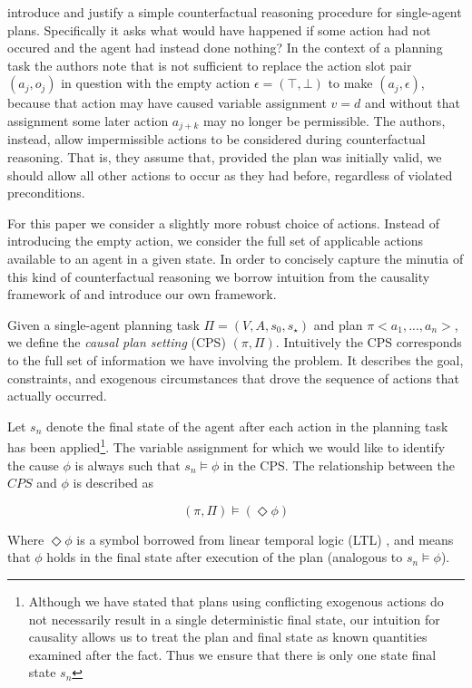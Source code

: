 \documentclass{article}
\theoremstyle{plain}
\theoremstyle{definition}
\begin{document}
\cite{lind2019ethical} introduce and justify a simple counterfactual reasoning procedure for single-agent plans. Specifically it asks what would have happened if some action had not occured and the agent had instead done nothing? In the context of a planning task the authors note that is not sufficient to replace the action slot pair $(a_j, o_j)$ in question with the empty action $\epsilon=(\top, \bot)$ to make $(a_j, \epsilon)$, because that action may have caused variable assignment $v=d$ and without that assignment some later action $a_{j+k}$ may no longer be permissible. The authors, instead, allow impermissible actions to be considered during counterfactual reasoning. That is, they assume that, provided the plan was initially valid, we should allow all other actions to occur as they had before, regardless of violated preconditions.

For this paper we consider a slightly more robust choice of actions. Instead of introducing the empty action, we consider the full set of applicable actions available to an agent in a given state. In order to concisely capture the minutia of this kind of counterfactual reasoning we borrow intuition from the causality framework of \cite{halpern2005causes} and introduce our own framework.

Given a single-agent planning task $\Pi=(V, A, s_0, s_\star)$ and plan $\pi<a_1,...,a_n>$, we define the \textit{causal plan setting} (CPS) $(\pi,\Pi)$. Intuitively the CPS corresponds to the full set of information we have involving the problem. It describes the goal, constraints, and exogenous circumstances that drove the sequence of actions that actually occurred.

Let $s_n$ denote the final state of the agent after each action in the planning task has been applied\footnote{Although we have stated that plans using conflicting exogenous actions do not necessarily result in a single deterministic final state, our intuition for causality allows us to treat the plan and final state as known quantities examined after the fact. Thus we ensure that there is only one state final state $s_n$}. The variable assignment for which we would like to identify the cause $\phi$ is always such that $s_n \models \phi$ in the CPS. The relationship between the $CPS$ and $\phi$ is described as

\[
(\pi, \Pi) \models (\Diamond \phi)
\]

Where $\Diamond \phi$ is a symbol borrowed from linear temporal logic (LTL) \cite{galton1987temporal}, and means that $\phi$ holds in the final state after execution of the plan (analogous to $s_n \models \phi$).
\end{document}
